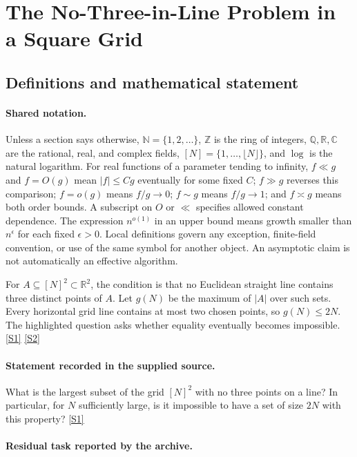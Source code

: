 \documentclass[11pt,a4paper]{article}
\newcommand{\N}{\mathbb{N}}
\newcommand{\Z}{\mathbb{Z}}
\newcommand{\Q}{\mathbb{Q}}
\newcommand{\R}{\mathbb{R}}
\newcommand{\C}{\mathbb{C}}
\newcommand{\sref}[2]{\hyperlink{source:#1:#2}{[S#2]}}
\begin{document}
\section{The No-Three-in-Line Problem in a Square Grid}\label{statement}


\subsection{Definitions and mathematical statement}

\paragraph{Shared notation.}Unless a section says otherwise, $\N=\{1,2,\ldots\}$,
$\Z$ is the ring of integers, $\Q,\R,\C$ are the rational, real, and complex
fields, $[N]=\{1,\ldots,\lfloor N\rfloor\}$, and $\log$ is the natural
logarithm. For real functions of a parameter tending to infinity,
$f\ll g$ and $f=O(g)$ mean $|f|\leq Cg$ eventually for some fixed $C$;
$f\gg g$ reverses this comparison; $f=o(g)$ means $f/g\to0$;
$f\sim g$ means $f/g\to1$; and $f\asymp g$ means both order bounds.
A subscript on $O$ or $\ll$ specifies allowed constant dependence.
The expression $n^{o(1)}$ in an upper bound means growth smaller than
$n^\epsilon$ for each fixed $\epsilon>0$. Local definitions govern any
exception, finite-field convention, or use of the same symbol for another
object. An asymptotic claim is not automatically an effective algorithm.



For $A\subseteq[N]^2\subset\R^2$, the condition is that no Euclidean straight line contains three distinct points of $A$. Let $g(N)$ be the maximum of $|A|$ over such sets. Every horizontal grid line contains at most two chosen points, so $g(N)\leq2N$. The highlighted question asks whether equality eventually becomes impossible. \sref{statement}{1} \sref{statement}{2}

\paragraph{Statement recorded in the supplied source.}
What is the largest subset of the grid $[N]^2$ with no three points on a line? In particular, for $N$ sufficiently large, is it impossible to have a set of size $2N$ with this property? \sref{statement}{1}

\paragraph{Residual task reported by the archive.}
\end{document}
